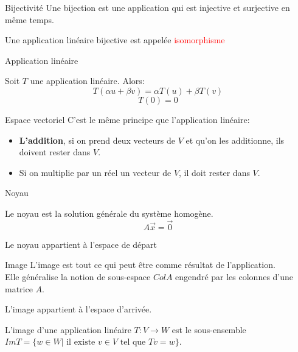 \begin{parag}{Bijectivité}
    Une bijection est une application qui est injective et surjective en même temps.
    \begin{definition}
        Une application linéaire bijective est appelée \textcolor{red}{isomorphisme}
    \end{definition}
\end{parag}
\begin{parag}{Application linéaire}
    \begin{truc}
        Soit $T$ une application linéaire. Alors:
        \[T(\alpha u + \beta v) = \alpha T(u) + \beta T(v)\]
        \[T(0) = 0\]
    \end{truc}
\end{parag}

\begin{parag}{Espace vectoriel}
    C'est le même principe que l'application linéaire:
    \begin{itemize}
        \item \textbf{L'addition}, si on prend deux vecteurs de $V$ et qu'on les additionne, ils doivent rester dans $V$.
        \item Si on multiplie par un réel un vecteur de $V$, il doit rester dans $V$.
    \end{itemize}
    
\end{parag}


\begin{parag}{Noyau}
    \begin{truc}
        Le noyau est la solution générale du système homogène.
        \[A\vec{x} = \vec{0} \]
    \end{truc}
    \begin{truc}
        Le noyau appartient à l'espace de départ 
    \end{truc}
\end{parag}
    
\begin{parag}{Image}
    L'image est tout ce qui peut être comme résultat de l'application.\\
    Elle généralise la notion de sous-espace $ColA$ engendré par les colonnes d'une matrice $A$.
    \begin{truc}
        L'image appartient à l'espace d'arrivée.
    \end{truc}
    \begin{truc}
        L'image d'une application linéaire $T: V \to W$ est le sous-ensemble $ImT = \{ w \in W| \text{ il existe } v \in V \text{ tel que } Tv = w\}$.
    \end{truc}
    
\end{parag}

